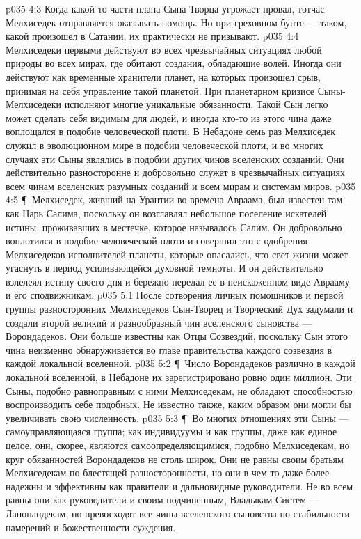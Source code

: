 \vs p035 4:3 Когда какой\hyp{}то части плана Сына\hyp{}Творца угрожает провал, тотчас Мелхиседек отправляется оказывать помощь. Но при греховном бунте --- таком, какой произошел в Сатании, их практически не призывают.
\vs p035 4:4 Мелхиседеки первыми действуют во всех чрезвычайных ситуациях любой природы во всех мирах, где обитают создания, обладающие волей. Иногда они действуют как временные хранители планет, на которых произошел срыв, принимая на себя управление такой планетой. При планетарном кризисе Сыны\hyp{}Мелхиседеки исполняют многие уникальные обязанности. Такой Сын легко может сделать себя видимым для людей, и иногда кто\hyp{}то из этого чина даже воплощался в подобие человеческой плоти. В Небадоне семь раз Мелхиседек служил в эволюционном мире в подобии человеческой плоти, и во многих случаях эти Сыны являлись в подобии других чинов вселенских созданий. Они действительно разносторонне и добровольно служат в чрезвычайных ситуациях всем чинам вселенских разумных созданий и всем мирам и системам миров.
\vs p035 4:5 \P\ Мелхиседек, живший на Урантии во времена Авраама, был известен там как Царь Салима, поскольку он возглавлял небольшое поселение искателей истины, проживавших в местечке, которое называлось Салим. Он добровольно воплотился в подобие человеческой плоти и совершил это с одобрения Мелхиседеков\hyp{}исполнителей планеты, которые опасались, что свет жизни может угаснуть в период усиливающейся духовной темноты. И он действительно взлелеял истину своего дня и бережно передал ее в неискаженном виде Аврааму и его сподвижникам.
\vs p035 5:1 После сотворения личных помощников и первой группы разносторонних Мелхиседеков Сын\hyp{}Творец и Творческий Дух задумали и создали второй великий и разнообразный чин вселенского сыновства --- Ворондадеков. Они больше известны как Отцы Созвездий, поскольку Сын этого чина неизменно обнаруживается во главе правительства каждого созвездия в каждой локальной вселенной.
\vs p035 5:2 \P\ Число Ворондадеков различно в каждой локальной вселенной, в Небадоне их зарегистрировано ровно один миллион. Эти Сыны, подобно равноправным с ними Мелхиседекам, не обладают способностью воспроизводить себе подобных. Не известно также, каким образом они могли бы увеличивать свою численность.
\vs p035 5:3 \P\ Во многих отношениях эти Сыны --- самоуправляющаяся группа; как индивидуумы и как группы, даже как единое целое, они, скорее, являются самоопределяющимися, подобно Мелхиседекам, но круг обязанностей Ворондадеков не столь широк. Они не равны своим братьям Мелхиседекам по блестящей разносторонности, но они в чем\hyp{}то даже более надежны и эффективны как правители и дальновидные руководители. Не во всем равны они как руководители и своим подчиненным, Владыкам Систем --- Ланонандекам, но превосходят все чины вселенского сыновства по стабильности намерений и божественности суждения.
